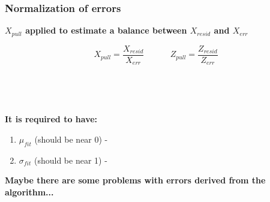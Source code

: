 \documentclass[svgnames] {beamer}
\begin{document}

\begin{frame}[shrink=20]

  \frametitle{\centering Normalization of errors}
  
  \begin{block}{\textbf{$X_{pull}$ applied to estimate a balance between $X_{resid}$ and $X_{err}$} }
    \begin{center}
      $$
      X_{pull} = \dfrac{X_{resid}}{X_{err}} ~~~~~~~~~~~~~~
      Z_{pull} = \dfrac{Z_{resid}}{Z_{err}}
      $$
    \end{center}
  \end{block}
   
  \begin{figure}[H]
    \centering
    \begin{minipage}[h]{0.4\linewidth}
      \\	
    \end{minipage}
    \begin{minipage}[h]{0.4\linewidth}
      \\
    \end{minipage}
  \end{figure}

  \begin{block}{\textbf{It is required to have:} }
    \begin{center}
      \begin{enumerate}
      \item $\mu_{fit}$ (should be near 0) - {}
      \item $\sigma_{fit}$ (should be near 1) - {}
      \end{enumerate}
    \end{center}
  \end{block}
  
  \begin{block}{}
    \begin{center}
      \textbf{Maybe there are some problems with errors derived from the algorithm...}
    \end{center}
  \end{block}

\end{frame}

\end{document}
